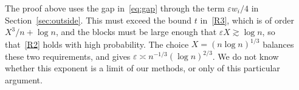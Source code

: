 \begin{remark}\label{rem:twothirds}
The proof above uses the gap in~\eqref{eq:gap} through the term $\varepsilon w_i/4$ in Section~\ref{sec:outside}. This must exceed the bound $t$ in~\ref{R3}, which is of order $X^3/n+\log n$, and the blocks must be large enough that $\varepsilon X\gtrsim\log n$, so that~\ref{R2} holds with high probability. The choice $X=(n\log n)^{1/3}$ balances these two requirements, and gives $\varepsilon\asymp n^{-1/3}(\log n)^{2/3}$. We do not know whether this exponent is a limit of our methods, or only of this particular argument.
\end{remark}
